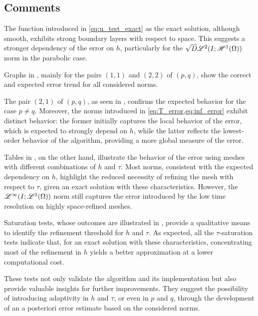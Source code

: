 \newpage
\subsection{Comments} \label{sec:test_discussion}

The function introduced in \cref{eq:u_test_exact} as the exact solution, although smooth, exhibits strong boundary layers with respect to space. This suggests a stronger dependency of the error on $h$, particularly for the $\sqrt{D} \mathscr{L}^{2}(I; \mathscr{H}^{1}(\Omega))$ norm in the parabolic case.

Graphs in , mainly for the pairs $\left( 1, 1 \right)$ and $\left( 2, 2 \right)$ of $\left( p, q \right)$, show the correct and expected error trend for all considered norms.

The pair $\left( 2, 1 \right)$ of $\left( p, q \right)$, as seen in , confirms the expected behavior for the case $p \neq q$. Moreover, the norms introduced in \cref{eq:T_error,eq:inf_error} exhibit distinct behavior: the former initially captures the local behavior of the error, which is expected to strongly depend on $h$, while the latter reflects the lowest-order behavior of the algorithm, providing a more global measure of the error.

Tables in , on the other hand, illustrate the behavior of the error using meshes with different combinations of $h$ and $\tau$. Most norms, consistent with the expected dependency on $h$, highlight the reduced necessity of refining the mesh with respect to $\tau$, given an exact solution with these characteristics. However, the $\mathscr{L}^{\infty}(I; \mathscr{L}^{2}(\Omega))$ norm still captures the error introduced by the low time resolution on highly space-refined meshes.

Saturation tests, whose outcomes are illustrated in , provide a qualitative means to identify the refinement threshold for $h$ and $\tau$. As expected, all the $\tau$-saturation tests indicate that, for an exact solution with these characteristics, concentrating most of the refinement in $h$ yields a better approximation at a lower computational cost.

These tests not only validate the algorithm and its implementation but also provide valuable insights for further improvements. They suggest the possibility of introducing adaptivity in $h$ and $\tau$, or even in $p$ and $q$, through the development of an a posteriori error estimate based on the considered norms.